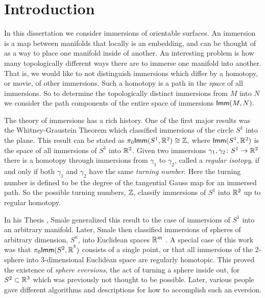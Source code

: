 \chapter{Introduction}



In this dissertation we consider immersions of orientable surfaces. An immersion is a map between manifolds that locally is an embedding, and can be thought of as a way to place one manifold inside of another. An interesting problem is how many topologically different ways there are to immerse one manifold into another. That is, we would like to not distinguish immersions which differ by a homotopy, or movie, of other immersions. Such a homotopy is a path in the \textit{space} of all immersions. So to determine the topologically distinct immersions from $M$ into $N$ we consider the path components of the entire space of immersions ${\sf Imm}(M, N).$

The theory of immersions has a rich history. One of the first major results was the Whitney-Graustein Theorem \cite{WG} which classified immersions of the circle $S^{1}$ into the plane. This result can be stated as $\pi_{0}{\sf Imm}(S^{1}, \mathbb R^{2}) \cong \mathbb Z,$ where ${\sf Imm}(S^{1}, \mathbb R^{2})$ is the space of all immersions of $S^{1}$ into $\mathbb R^{2}$. Given two immersions $\gamma_{1}, \gamma_{2} \colon S^{1} \rightarrow \mathbb R^{2}$ there is a homotopy through immersions from $\gamma_{1}$ to $\gamma_{2}$, called a \textit{regular isotopy}, if and only if both $\gamma_{1}$ and $\gamma_{2}$ have the same \textit{turning number}. Here the turning number is defined to be the degree of the tangential Gauss map for an immersed path. So the possible turning numbers, $\mathbb Z$, classify immersions of $S^{1}$ into $\mathbb R^{2}$ up to regular homotopy.

In his Thesis \cite{Sm1}, Smale generalized this result to the case of immersions of $S^{1}$ into an arbitrary manifold. Later, Smale then classified immersions of spheres of arbitrary dimension, $S^{n}$, into Euclidean spaces $\mathbb R^{m}$ \cite{Sm3}. A special case of this work was that $\pi_{0}{\sf Imm}(S^{2}, \mathbb R^{^{3}})$ consists of a single point, or that all immersions of the 2-sphere into 3-dimensional Euclidean space are regularly homotopic. This proved the existence of \textit{sphere eversions}, the act of turning a sphere inside out, for $S^{2} \subset \mathbb R^{3}$ which was previously not thought to be possible. Later, various people gave different algorithms and descriptions for how to accomplish such an eversion.

